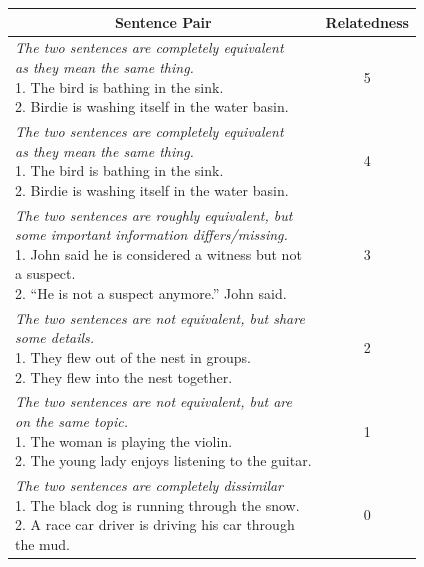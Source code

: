 \begin{enumerate}
 
   \begin{table}[ht!]
 	\centering 	
 	\begin{tabular}{l|c} 
 		\hline
 		\multicolumn{1}{c|}{\textbf{Sentence Pair}} & 
 		\multicolumn{1}{c}{\textbf{Relatedness}}  \\
 		\hline
 		\makecell[l]
 		{\textit{The two sentences are completely equivalent}  \\ \textit{as they mean the same thing.} \\
 			1. The bird is bathing in the sink. \\ 
 			2. Birdie is washing itself in the water basin.} & 5  \\
 		\hline
 		\makecell[l]
 		{\textit{The two sentences are completely equivalent}  \\ \textit{as they mean the same thing.} \\
 			1. The bird is bathing in the sink. \\ 
 			2. Birdie is washing itself in the water basin.} & 4  \\
 		\hline
 		\makecell[l]
 		{\textit{The two sentences are roughly equivalent, but }  \\ \textit{some important information differs/missing.} \\
 			1. John said he is considered a witness but not \\ a suspect. \\ 
 			2. “He is not a suspect anymore.” John said.} & 3  \\
 		\hline
 		\makecell[l]
 		{\textit{The two sentences are not equivalent, but share } \\
 			\textit{some details.} \\
 			1. They flew out of the nest in groups. \\ 
 			2. They flew into the nest together.} & 2  \\
 		\hline
 		\makecell[l]
 		{\textit{The two sentences are not equivalent, but are } \\
 			\textit{on the same topic.} \\
 			1. The woman is playing the violin. \\ 
 			2. The young lady enjoys listening to the guitar.} & 1  \\
 		\hline
 		\makecell[l]
 		{\textit{The two sentences are completely dissimilar} \\
 			1. The black dog is running through the snow. \\ 
 			2. A race car driver is driving his car through \\ the mud.} & 0  \\
 		\hline
 	

\end{tabular}
\end{table}
\end{enumerate}
